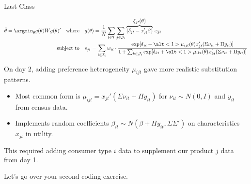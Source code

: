 \documentclass[aspectratio=169,t,11pt,table]{beamer}
\begin{document}

\begin{frame}{Last Class}
    \vspace{-2.5\baselineskip}
    \begin{minipage}[c][8\baselineskip][c]{\textwidth}
        \begin{align*}
            \hat{\theta} = \argmin_\theta g(\theta) W g(\theta)' \quad\text{where}&\quad g(\theta) = \frac{1}{N} \sum_{t \in \mathcal{T}} \sum_{j \in \mathcal{J}_t} \overbrace{(\delta_{jt} - x_{jt}'\beta)}^{\textstyle\xi_{jt}(\theta)} \cdot z_{jt} \\
            \text{subject to}&\quad s_{jt} = \sum_{i \in \mathcal{I}_t} w_{it} \cdot \frac{\exp[\delta_{jt} + \alt<1>{\mu_{ijt}(\theta)}{x_{jt}'(\Sigma\nu_{it} + \Pi y_{it})}]}{1 + \sum_{k \in \mathcal{J}_t} \exp[\delta_{kt} + \alt<1>{\mu_{ikt}(\theta)}{x_{kt}'(\Sigma\nu_{it} + \Pi y_{it})}]}
        \end{align*}
    \end{minipage}
     \vspace{-0.5\baselineskip}
    \begin{wideitemize}
        \item On day 2, adding preference heterogeneity $\mu_{ijt}$ gave more realistic substitution patterns.
        \pause
        \begin{itemize}
            \item Most common form is $\mu_{ijt} = x_{jt}'(\Sigma\nu_{it} + \Pi y_{it})$ for $\nu_{it} \sim N(0, I)$ and $y_{it}$ from census data.
            \item Implements random coefficients $\beta_{it} \sim N(\beta + \Pi y_{it}, \Sigma\Sigma')$ on characteristics $x_{jt}$ in utility.
        \end{itemize}
        \pause
        \item This required adding consumer type $i$ data to supplement our product $j$ data from day 1.
        \pause
        \item Let's go over your second coding exercise.
    \end{wideitemize}
\end{frame}
\end{document}
